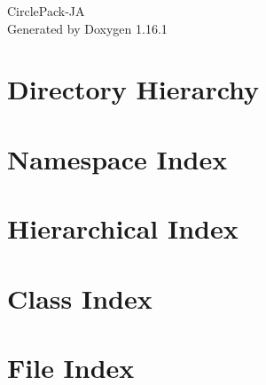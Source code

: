 \documentclass[twoside]{book}
\newcommand{\+}{\discretionary{\mbox{\scriptsize$\hookleftarrow$}}{}{}}
\newcommand{\clearemptydoublepage}{%
    \newpage{\pagestyle{empty}\cleardoublepage}%
  }
\begin{document}
  \raggedbottom
  \begin{titlepage}
  \vspace*{7cm}
  \begin{center}%
  {\Large Circle\+Pack-\/\+JA}\\
  \vspace*{1cm}
  {\large Generated by Doxygen 1.16.1}\\
  \end{center}
  \end{titlepage}
  \clearemptydoublepage
  \tableofcontents
  \clearemptydoublepage

\chapter{Directory Hierarchy}

\chapter{Namespace Index}

\chapter{Hierarchical Index}

\chapter{Class Index}

\chapter{File Index}

\end{document}
